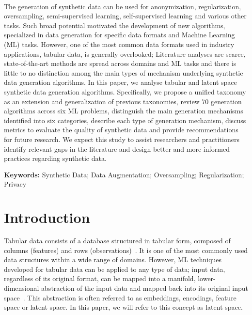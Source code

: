 ~\label{chp:synthetic-data-review}
\graphicspath{{figures/synthetic-data-review/}}

\begin{adjustwidth}{30pt}{30pt}

    The generation of synthetic data can be used for anonymization,
    regularization, oversampling, semi-supervised learning, self-supervised
    learning and various other tasks. Such broad potential motivated the
    development of new algorithms, specialized in data generation for specific
    data formats and Machine Learning (ML) tasks. However, one of the most
    common data formats used in industry applications, tabular data, is
    generally overlooked; Literature analyses are scarce, state-of-the-art
    methods are spread across domains and ML tasks and there is little to no
    distinction among the main types of mechanism underlying synthetic data
    generation algorithms. In this paper, we analyse tabular and latent space
    synthetic data generation algorithms. Specifically, we propose a unified
    taxonomy as an extension and generalization of previous taxonomies, review
    70 generation algorithms across six ML problems, distinguish the main
    generation mechanisms identified into six categories, describe each type
    of generation mechanism, discuss metrics to evaluate the quality of
    synthetic data and provide recommendations for future research. We expect
    this study to assist researchers and practitioners identify relevant gaps
    in the literature and design better and more informed practices regarding
    synthetic data.

\end{adjustwidth}

\vspace{.5cm}
\textbf{Keywords:} Synthetic Data; Data Augmentation; Oversampling;
Regularization; Privacy

\section{Introduction}\label{sec:introduction-synth}

Tabular data consists of a database structured in tabular form, composed of
columns (features) and rows (observations)~\cite{yoon2020vime}. It is one of
the most commonly used data structures within a wide range of domains.
However, ML techniques developed for tabular data can be applied to any type
of data; input data, regardless of its original format, can be mapped into a
manifold, lower-dimensional abstraction of the input data and mapped back into
its original input space~\cite{kingma2019introduction, devries2017dataset}.
This abstraction is often referred to as embeddings, encodings, feature
space or latent space. In this paper, we will refer to this concept as
latent space.

